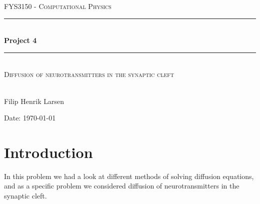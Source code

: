 \documentclass[norsk, a4paper]{article}
\begin{document}
\renewcommand{\figurename}{Figure}
\begin{titlepage}
\begin{center}

\textsc{\Large FYS3150 - Computational Physics}\\[0.5cm]
\rule{\linewidth}{0.5mm} \\[0.4cm]
{ \huge \bfseries  Project 4}\\[0.10cm]
\rule{\linewidth}{0.5mm} \\[1.5cm]
\textsc{\Large Diffusion of neurotransmitters in the synaptic cleft}\\[1.5cm]
\textsc{}\\[1.5cm]

\begin{minipage}{0.49\textwidth}
    \begin{center} \large
        Filip Henrik Larsen\\[0.8cm]
    \end{center}
\end{minipage}


\vfill

\large{Date: \today}

\end{center}
\end{titlepage}

\section{Introduction}
In this problem we had a look at different methods of solving diffusion equations, and as a specific problem we considered diffusion of neurotransmitters in the synaptic cleft. 
\end{document}
